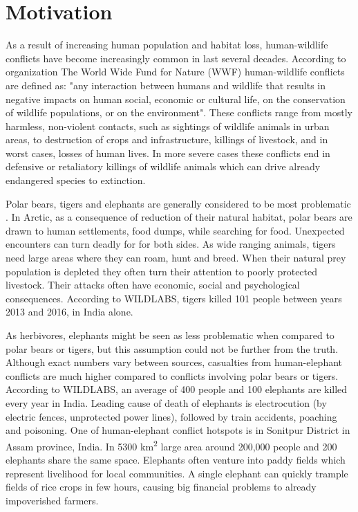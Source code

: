 \section{ Motivation}

As a result of increasing human population and habitat loss, human-wildlife conflicts have become increasingly common in last several decades\cite{philip-wildlife}.
According to organization The World Wide Fund for Nature (WWF) human-wildlife conflicts are defined as: "any interaction between humans and wildlife that results in negative impacts on human social, economic or cultural life, on the conservation of wildlife populations, or on the environment"\cite{conflict-manual}.
These conflicts range from mostly harmless, non-violent contacts, such as sightings of wildlife animals in urban areas, to destruction of crops and infrastructure, killings of livestock, and in worst cases, losses of human lives.
In more severe cases these conflicts end in defensive or retaliatory killings of wildlife animals which can drive already endangered species to extinction.

Polar bears, tigers and elephants are generally considered to be most problematic \cite{philip-wildlife}.
In Arctic, as a consequence of reduction of their natural habitat, polar bears are drawn to human settlements, food dumps, while searching for food\cite{wildlabs-polarbears}.
Unexpected encounters can turn deadly for for both sides.
As wide ranging animals, tigers need large areas where they can roam, hunt and breed\cite{wildlabs-tigers}.
When their natural prey population is depleted they often turn their attention to poorly protected livestock. 
Their attacks often have economic, social and psychological consequences.
According to WILDLABS, tigers killed 101 people between years 2013 and 2016, in India alone\cite{wildlabs-tigers}.

As herbivores, elephants might be seen as less problematic when compared to polar bears or tigers, but this assumption could not be further from the truth.
Although exact numbers vary between sources, casualties from human-elephant conflicts are much higher compared to conflicts involving polar bears or tigers.
According to WILDLABS, an average of 400 people and 100 elephants are killed every year in India\cite{wildlabs-elephants}. 
Leading cause of death of elephants is electrocution (by electric fences, unprotected power lines), followed by train accidents, poaching and poisoning\cite{cause-of-death}.
One of human-elephant conflict hotspots is in Sonitpur District in Assam province, India. 
In 5300 km\textsuperscript{2} large area around 200,000 people and 200 elephants share the same space\cite{wildlabs-elephants}.
Elephants often venture into paddy fields which represent livelihood for local communities.
A single elephant can quickly trample fields of rice crops in few hours, causing big financial problems to already impoverished farmers\cite{wildlabs-elephants}.

